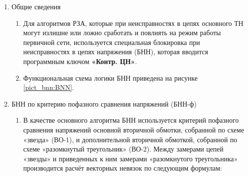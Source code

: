 
\color{black}

\begin{enumerate}[label=\arabic{section}.\arabic{subsection}.\arabic{enumi}, labelsep=4pt, leftmargin=0pt, itemindent=57pt, itemsep=0pt, parsep=5pt] %

\item Общие сведения
\begin{enumerate}[label=\arabic{section}.\arabic{subsection}.\arabic{enumi}.\arabic*, labelsep=4pt, leftmargin=0em, itemindent=65pt, parsep=0pt]

\item
Для алгоритмов РЗА, которые при неисправностях в цепях основного ТН могут излишне или ложно сработать и повлиять на режим работы первичной сети, используется специальная блокировка при неисправностях в цепях напряжения (БНН), которая вводится программным ключом \textbf{«Контр. ЦН»}.

\item
Функциональная схема логики БНН приведена на рисунке \ref{pict_bnn:BNN}.

\end{enumerate}

\item БНН по критерию пофазного сравнения напряжений (БНН-ф)
\begin{enumerate}[label=\arabic{section}.\arabic{subsection}.\arabic{enumi}.\arabic*, labelsep=4pt, leftmargin=0em, itemindent=65pt, parsep=0pt]

\item
В качестве основного алгоритма БНН используется критерий пофазного сравнения напряжений основной вторичной обмотки, собранной по схеме «звезда» (ВО-1), и дополнительной вторичной обмоткой, собранной по схеме «разомкнутый треугольник» (ВО-2). Между замерами цепей «звезды» и приведенных к ним замерами «разомкнутого треугольника» производится расчёт векторных невязок по следующим формулам:


\end{enumerate}
\end{enumerate}
